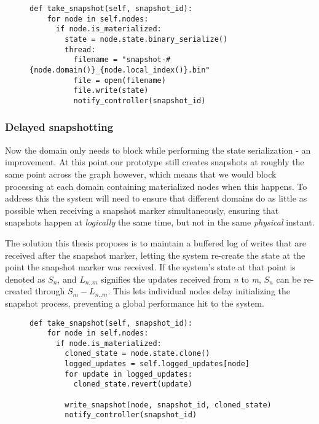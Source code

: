\documentclass[b5paper]{report}
\begin{document}
\begin{figure}[H]
  \begin{lstlisting}[caption="Asynchronous snapshotting"]
  def take_snapshot(self, snapshot_id):
    for node in self.nodes:
      if node.is_materialized:
        state = node.state.binary_serialize()
        thread:
          filename = "snapshot-#{node.domain()}_{node.local_index()}.bin"
          file = open(filename)
          file.write(state)
          notify_controller(snapshot_id)
  \end{lstlisting}
\end{figure}

\subsubsection{Delayed snapshotting}
Now the domain only needs to block while performing the state serialization - an
improvement. At this point our prototype still creates snapshots at roughly the
same point across the graph however, which means that we would block processing
at each domain containing materialized nodes when this happens. To address this
the system will need to ensure that different domains do as little as possible
when receiving a snapshot marker simultaneously, ensuring that snapshots happen
at \textit{logically} the same time, but not in the same \textit{physical}
instant.

The solution this thesis proposes is to maintain a buffered log of writes that
are received after the snapshot marker, letting the system re-create the state
at the point the snapshot marker was received. If the system's state at that
point is denoted as $ S_n $, and $ L_{n..m} $ signifies the updates received
from \textit{n} to \textit{m}, $ S_n $ can be re-created through
$ S_m - L_{n..m} $. This lets individual nodes delay initializing the snapshot
process, preventing a global performance hit to the system.

\begin{figure}[H]
  \begin{lstlisting}[caption="Delayed snapshotting"]
  def take_snapshot(self, snapshot_id):
    for node in self.nodes:
      if node.is_materialized:
        cloned_state = node.state.clone()
        logged_updates = self.logged_updates[node]
        for update in logged_updates:
          cloned_state.revert(update)

        write_snapshot(node, snapshot_id, cloned_state)
        notify_controller(snapshot_id)
  \end{lstlisting}
\end{figure}
\end{document}
